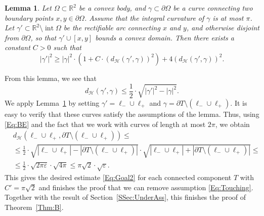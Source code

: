 \documentclass[11pt, oneside]{amsart}
\newcommand{\R}{\mathbb{R}}
\newcommand{\dH}{d_{\mathcal H}}
\newcommand{\eps}{\varepsilon}
\DeclareMathOperator{\inter}{int}
\newcommand{\sm}{\setminus}
\renewcommand{\ge}{\geqslant}
\renewcommand{\le}{\leqslant}
\theoremstyle{theorem}
\newtheorem{lemma}[theorem]{Lemma}
\theoremstyle{Intro}
\theoremstyle{definition}
\theoremstyle{remark}
\theoremstyle{claim}
\numberwithin{equation}{section}
\begin{document}
\begin{lemma}
\label{Lem:BZ}
    Let $\Omega \subset \R^2$ be a convex body, and $\gamma \subset \partial \Omega$ be a curve connecting two boundary points $x, y \in \partial \Omega$. Assume that the integral curvature of $\gamma$ is at most $\pi$. Let $\gamma' \subset \R^2 \sm \inter \Omega$ be the rectifiable arc connecting $x$ and $y$, and otherwise disjoint from $\partial \Omega$, so that $\gamma' \cup [x,y]$ bounds a convex domain. Then there exists a constant $C > 0$ such that
    \[
    |\gamma'|^2 \ge |\gamma|^2 \cdot \left(1 + C \cdot \left(\dH(\gamma', \gamma)\right)^2\right) + 4 \left(\dH(\gamma', \gamma)\right)^2. 
    \]%
\end{lemma}

From this lemma, we see that
\[
\dH(\gamma', \gamma) \le \frac{1}{2} \cdot \sqrt{|\gamma'|^2 - |\gamma|^2}.
\]
We apply Lemma~\ref{Lem:BZ} by setting $\gamma' = \ell_- \cup \ell_+$ and $\gamma = \partial T \sm (\ell_- \cup \ell_+)$. It is easy to verify that these curves satisfy the assumptions of the lemma. Thus, using \eqref{Eq:BE} and the fact that we work with curves of length at most $2\pi$, we obtain
\begin{equation*}
    \begin{aligned}
        &\dH(\ell_- \cup \ell_+, \partial T \sm (\ell_- \cup \ell_+)) \le \\ 
        &\le \frac{1}{2} \cdot \sqrt{|\ell_- \cup \ell_+| - |\partial T \sm (\ell_- \cup \ell_+)|} \cdot \sqrt{|\ell_- \cup \ell_+| + |\partial T \sm (\ell_- \cup \ell_+)|} \le\\
        &\le \frac{1}{2} \cdot \sqrt{2\pi \eps} \cdot \sqrt{4\pi} \le \pi\sqrt{2} \cdot \sqrt{\eps}.
    \end{aligned}
\end{equation*}
This gives the desired estimate \eqref{Eq:Goal2} for each connected component $T$ with $C' = \pi \sqrt{2}$ and finishes the proof that we can remove assumption \eqref{Eq:Touching}. Together with the result of Section~\ref{SSec:UnderAss}, this finishes the proof of Theorem~\ref{Thm:B}.
\end{document}
